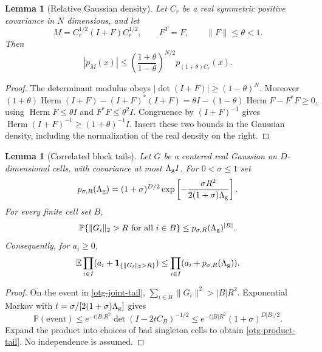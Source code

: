 \documentclass[11pt]{article}
\newtheorem{lemma}[theorem]{Lemma}
\theoremstyle{remark}
\begin{document}
\begin{lemma}[Relative Gaussian density]\label{otg-density-lemma}
Let $C_r$ be a real symmetric positive covariance in $N$
dimensions, and let
\[
 M=C_r^{1/2}(I+F)C_r^{1/2},\qquad F^T=F,\qquad
                       \|F\|\le\theta<1.
\]
Then
\begin{equation}\label{otg-density}
 |p_M(x)|
 \le\left(\frac{1+\theta}{1-\theta}\right)^{N/2}
                                p_{(1+\theta)C_r}(x).
\end{equation}
\end{lemma}
\begin{proof}
The determinant modulus obeys
$|\det(I+F)|\ge(1-\theta)^N$. Moreover
\[
 (1+\theta)\operatorname{Herm}(I+F)-(I+F)^*(I+F)
 =\theta I-(1-\theta)\operatorname{Herm}F-F^*F\ge0,
\]
using $\operatorname{Herm}F\le\theta I$ and
$F^*F\le\theta^2I$.
Congruence by $(I+F)^{-1}$ gives
$\operatorname{Herm}(I+F)^{-1}\ge(1+\theta)^{-1}I$.
Insert these two bounds in the Gaussian density, including
the normalization of the real density on the right.
\end{proof}

\begin{lemma}[Correlated block tails]\label{otg-tail-lemma}
Let $G$ be a centered real Gaussian on $D$-dimensional cells, with
covariance at most $\Lambda_{\rm g} I$. For $0<\sigma\le1$ set
\begin{equation}\label{otg-tail-constant}
 p_{\sigma,R}(\Lambda_{\rm g})
  =(1+\sigma)^{D/2}
             \exp\left[-\frac{\sigma R^2}{2(1+\sigma)\Lambda_{\rm g}}\right].
\end{equation}
For every finite cell set $B$,
\begin{equation}\label{otg-joint-tail}
 \mathbb P\{\|G_i\|_2>R\text{ for all }i\in B\}
                   \le p_{\sigma,R}(\Lambda_{\rm g})^{|B|}.
\end{equation}
Consequently, for $a_i\ge0$,
\begin{equation}\label{otg-product-tail}
 \mathbb E\prod_{i\in I}
            (a_i+\mathbf1_{\{\|G_i\|_2>R\}})
                  \le\prod_{i\in I}(a_i+p_{\sigma,R}(\Lambda_{\rm g})).
\end{equation}
\end{lemma}
\begin{proof}
On the event in \eqref{otg-joint-tail},
$\sum_{i\in B}\|G_i\|^2>|B|R^2$.
Exponential Markov with
$t=\sigma/[2(1+\sigma)\Lambda_{\rm g}]$ gives
\[
 \mathbb P(\text{event})
 \le e^{-t|B|R^2}\det(I-2tC_B)^{-1/2}
 \le e^{-t|B|R^2}(1+\sigma)^{D|B|/2}.
\]
Expand the product into choices of bad singleton cells to
obtain \eqref{otg-product-tail}. No independence is assumed.
\end{proof}
\end{document}
